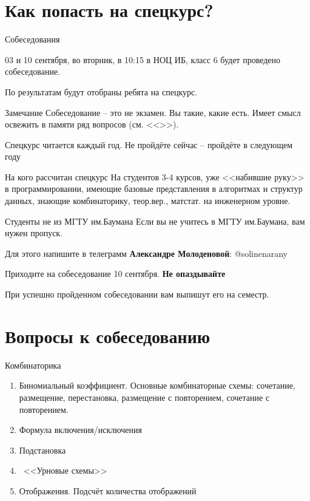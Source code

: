 \documentclass{beamer}
\begin{document}
  \section{Как попасть на спецкурс?}\label{section:how_to}
  
  \begin{frame}{Собеседования}
  
  03 и 10 сентября, во вторник, в 10:15 в НОЦ ИБ, класс 6
  будет проведено собеседование. 
	
  По результатам будут отобраны ребята на спецкурс.

   \begin{block}{Замечание}
   	Собеседование -- это не экзамен. Вы такие, какие есть. 
   	Имеет смысл освежить в памяти ряд вопросов 
   	(см. <<>>).
   	
   	Спецкурс читается каждый год. Не пройдёте сейчас -- 
   	пройдёте в следующем году
   \end{block}
  
  \end{frame}
  
  \begin{frame}{На кого рассчитан спецкурс}
  На студентов 3-4 курсов, уже <<набившие руку>> в программировании,
  имеющие базовые представления в алгоритмах и структур данных,
  знающие комбинаторику, теор.вер., матстат. на инженерном уровне.
  
  \end{frame}

  \begin{frame}{Студенты не из МГТУ им.Баумана}
  Если вы не учитесь в МГТУ им.Баумана, вам нужен пропуск.
  
  Для этого напишите в телеграмм \textbf{Александре Молоденовой}: @solinenarany
  
  Приходите на собеседование 10 сентября. 
  \textbf{Не опаздывайте}
  
  При успешно пройденном собеседовании вам выпишут его на семестр.
  \end{frame}
  
  \section{Вопросы к собеседованию}\label{section:quastions}
  
  \begin{frame}{Комбинаторика}
  \begin{enumerate}
  	\item Биномиальный коэффициент. Основные комбинаторные схемы: сочетание, размещение, перестановка, размещение с повторением, сочетание с повторением.
  	\item Формула включения/исключения
  	\item Подстановка
  	\item ~<<Урновые схемы>>
  	\item Отображения. Подсчёт количества отображений
  \end{enumerate}
  \end{frame}
  
\end{document}
